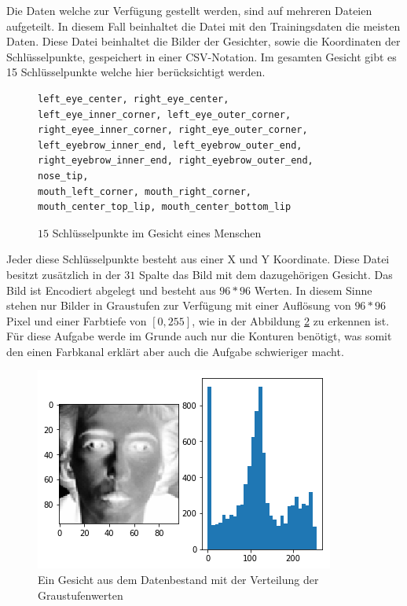 Die Daten welche zur Verfügung gestellt werden, sind auf mehreren Dateien aufgeteilt. 
In diesem Fall beinhaltet die Datei mit den Trainingsdaten die meisten Daten. 
Diese Datei beinhaltet die Bilder der Gesichter, sowie die Koordinaten der Schlüsselpunkte, gespeichert in einer CSV-Notation.
Im gesamten Gesicht gibt es 15 Schlüsselpunkte welche hier berücksichtigt werden. 
\begin{figure}[ht!]
\lstset{language=Python}
\begin{lstlisting}
left_eye_center, right_eye_center, 
left_eye_inner_corner, left_eye_outer_corner, right_eyee_inner_corner, right_eye_outer_corner, 
left_eyebrow_inner_end, left_eyebrow_outer_end, right_eyebrow_inner_end, right_eyebrow_outer_end, 
nose_tip, 
mouth_left_corner, mouth_right_corner, 
mouth_center_top_lip, mouth_center_bottom_lip
\end{lstlisting}
	\caption{$15$ Schlüsselpunkte im Gesicht eines Menschen}
	\label{fig:15keypoints}
\end{figure}
Jeder diese Schlüsselpunkte besteht aus einer X und Y Koordinate. 
Diese Datei besitzt zusätzlich in der $31$ Spalte das Bild mit dem dazugehörigen Gesicht.
Das Bild ist Encodiert abgelegt und besteht aus $96 * 96$ Werten. 
In diesem Sinne stehen nur Bilder in Graustufen zur Verfügung mit einer Auflösung von $96 * 96$ Pixel und einer Farbtiefe von $[0, 255]$, wie in der Abbildung \ref{fig:ausgangsdaten} zu erkennen ist. 
Für diese Aufgabe werde im Grunde auch nur die Konturen benötigt, was somit den einen Farbkanal erklärt aber auch die Aufgabe schwieriger macht. 
\begin{figure}
	\centering
	\includegraphics[scale=0.75]{images/ausgangsDaten.png}
	\caption{Ein Gesicht aus dem Datenbestand mit der Verteilung der Graustufenwerten}
	\label{fig:ausgangsdaten}
\end{figure}
